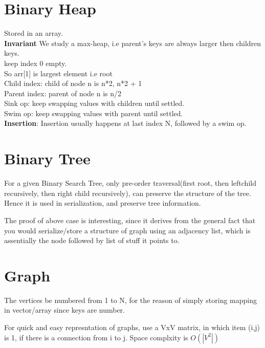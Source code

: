 \documentclass[10pt,a4paper]{article}
\begin{document}
	
	
	\section{Binary Heap}
	
	Stored in an array. \\

	\textbf{Invariant} We study a max-heap, i.e parent's keys are always larger then children keys. \\
	
	keep index 0 empty. \\
	So arr[1] is largest element i.e root\\
	
	Child index: child of node n is n*2, n*2 + 1\\
	Parent index: parent of node n is n/2\\
	
	Sink op: keep swapping values with children until settled.\\
	Swim op: keep swapping values with parent until settled.\\
	
	\textbf{Insertion}: Insertion usually happens at last index N, followed by a swim op.\\
	
	\section{Binary Tree}
	
	For a given Binary Search Tree, only pre-order traversal(first root, then leftchild recursively, then right child recursively), can preserve the structure of the tree. Hence it is used in serialization, and preserve tree information.
	
	The proof of above case is interesting, since it derives from the general fact that you would serialize/store a structure of graph using an adjacency list, which is assentially the node followed by list of stuff it points to.
	
	\section{Graph}
	
	The vertices be numbered from 1 to N, for the reason of simply storing mapping in vector/array since keys are number.
	
	For quick and easy represntation of graphs, use a VxV matrix, in which item (i,j) is 1, if there is a connection from i to j. Space complxity is $O(|V^{2}|)$
	
\end{document}
